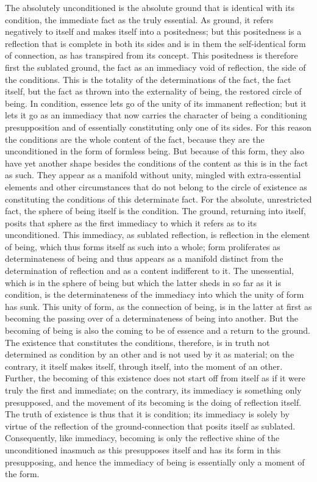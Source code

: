The absolutely unconditioned is the absolute ground
that is identical with its condition,
the immediate fact as the truly essential.
As ground, it refers negatively to itself
and makes itself into a positedness;
but this positedness is a reflection
that is complete in both its sides
and is in them the self-identical form of connection,
as has transpired from its concept.
This positedness is therefore first the sublated ground,
the fact as an immediacy void of reflection,
the side of the conditions.
This is the totality of the determinations of the fact,
the fact itself, but the fact as thrown into
the externality of being, the restored circle of being.
In condition, essence lets go of the unity of its immanent reflection;
but it lets it go as an immediacy that now carries
the character of being a conditioning presupposition
and of essentially constituting only one of its sides.
For this reason the conditions are the whole content of the fact,
because they are the unconditioned in the form of formless being.
But because of this form, they also have yet another shape besides
the conditions of the content as this is in the fact as such.
They appear as a manifold without unity,
mingled with extra-essential elements
and other circumstances that do not belong
to the circle of existence as constituting
the conditions of this determinate fact.
For the absolute, unrestricted fact,
the sphere of being itself is the condition.
The ground, returning into itself, posits
that sphere as the first immediacy
to which it refers as to its unconditioned.
This immediacy, as sublated reflection,
is reflection in the element of being,
which thus forms itself as such into a whole;
form proliferates as determinateness of being
and thus appears as a manifold distinct from
the determination of reflection
and as a content indifferent to it.
The unessential, which is in the sphere of being
but which the latter sheds in so far as it is condition,
is the determinateness of the immediacy into which
the unity of form has sunk.
This unity of form, as the connection of being,
is in the latter at first as becoming the passing over
of a determinateness of being into another.
But the becoming of being is also the coming to be
of essence and a return to the ground.
The existence that constitutes the conditions, therefore,
is in truth not determined as condition by an other
and is not used by it as material;
on the contrary, it itself makes itself, through itself,
into the moment of an other.
Further, the becoming of this existence
does not start off from itself
as if it were truly the first and immediate;
on the contrary, its immediacy is
something only presupposed, and the movement of
its becoming is the doing of reflection itself.
The truth of existence is thus that it is condition;
its immediacy is solely by virtue of
the reflection of the ground-connection
that posits itself as sublated.
Consequently, like immediacy, becoming is only
the reflective shine of the unconditioned
inasmuch as this presupposes itself
and has its form in this presupposing,
and hence the immediacy of being is essentially
only a moment of the form.

